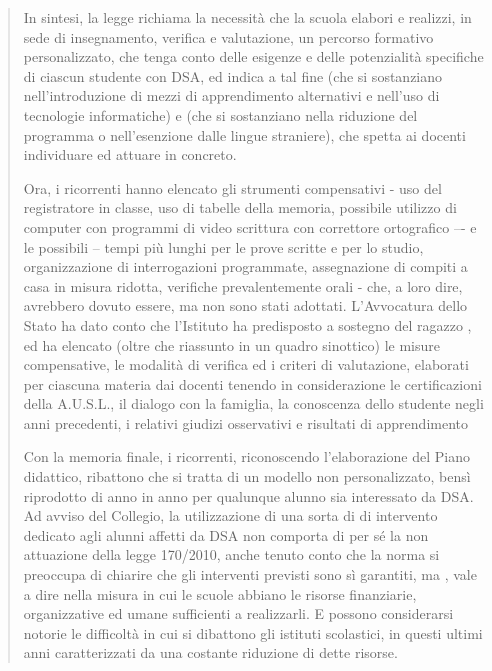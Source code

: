  \begin{quote}
 \begin{description}
\item 	\mancatesto
 In sintesi, la legge richiama la necessità che la scuola elabori e realizzi, in sede di insegnamento, verifica e valutazione, un percorso formativo personalizzato, che tenga conto delle esigenze e delle potenzialità specifiche di ciascun studente con DSA, ed indica a tal fine  (che si sostanziano nell'introduzione di mezzi di apprendimento alternativi e nell'uso di tecnologie informatiche) e  (che si sostanziano nella riduzione del programma o nell'esenzione dalle lingue straniere), che spetta ai docenti individuare ed attuare in concreto.
 \item[6] Ora, i ricorrenti hanno elencato gli strumenti compensativi - uso del registratore in classe, uso di tabelle della memoria, possibile utilizzo di computer con programmi di video scrittura con correttore ortografico –- e le possibili  -- tempi più lunghi per le prove scritte e per lo studio, organizzazione di interrogazioni programmate, assegnazione di compiti a casa in misura ridotta, verifiche prevalentemente orali - che, a loro dire, avrebbero dovuto essere, ma non sono stati adottati.
L'Avvocatura dello Stato ha dato conto che l'Istituto ha predisposto a sostegno del ragazzo , ed ha elencato (oltre che riassunto in un quadro sinottico) le misure compensative, le modalità di verifica ed i criteri di valutazione, elaborati per ciascuna materia dai docenti tenendo in considerazione le certificazioni della A.U.S.L., il dialogo con la famiglia, la conoscenza dello studente negli anni precedenti, i relativi giudizi osservativi e risultati di apprendimento
\item[7] Con la memoria finale, i ricorrenti, riconoscendo l'elaborazione del Piano didattico, ribattono che si tratta di un modello non personalizzato, bensì riprodotto di anno in anno per qualunque alunno sia interessato da DSA.
Ad avviso del Collegio, la utilizzazione di una sorta di  di intervento dedicato agli alunni affetti da DSA non comporta di per sé la non attuazione della legge 170/2010, anche tenuto conto che la norma si preoccupa di chiarire che gli interventi previsti sono sì garantiti, ma , vale a dire nella misura in cui le scuole abbiano le risorse finanziarie, organizzative ed umane sufficienti a realizzarli. E possono considerarsi notorie le difficoltà in cui si dibattono gli istituti scolastici, in questi ultimi anni caratterizzati da una costante riduzione di dette risorse.

\end{description}
\end{quote}
